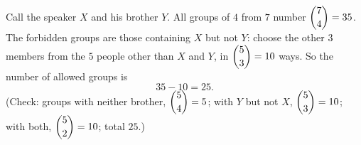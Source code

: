 Call the speaker $X$ and his brother $Y$. All groups of $4$ from $7$ number $\dbinom74=35$. The forbidden groups are those containing $X$ but not $Y$: choose the other $3$ members from the $5$ people other than $X$ and $Y$, in $\dbinom53=10$ ways. So the number of allowed groups is
\[
35-10=\boxed{25}.
\]
(Check: groups with neither brother, $\dbinom54=5$; with $Y$ but not $X$, $\dbinom53=10$; with both, $\dbinom52=10$; total $25$.)
